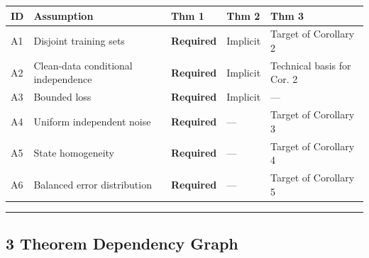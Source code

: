 \documentclass[
  12pt,
]{ctexart}
\begin{document}
\begin{longtable}[]{@{}
  >{\raggedright\arraybackslash}p{}
  >{\raggedright\arraybackslash}p{}
  >{\raggedright\arraybackslash}p{}
  >{\raggedright\arraybackslash}p{}
  >{\raggedright\arraybackslash}p{}@{}}
\toprule\noalign{}
\begin{minipage}[b]{\linewidth}\raggedright
ID
\end{minipage} & \begin{minipage}[b]{\linewidth}\raggedright
Assumption
\end{minipage} & \begin{minipage}[b]{\linewidth}\raggedright
Thm 1
\end{minipage} & \begin{minipage}[b]{\linewidth}\raggedright
Thm 2
\end{minipage} & \begin{minipage}[b]{\linewidth}\raggedright
Thm 3
\end{minipage} \\
\midrule\noalign{}
\endhead
\bottomrule\noalign{}
\endlastfoot
A1 & Disjoint training sets & \textbf{Required} & Implicit & Target of
Corollary 2 \\
A2 & Clean-data conditional independence & \textbf{Required} & Implicit
& Technical basis for Cor. 2 \\
A3 & Bounded loss & \textbf{Required} & Implicit & --- \\
A4 & Uniform independent noise & \textbf{Required} & --- & Target of
Corollary 3 \\
A5 & State homogeneity & \textbf{Required} & --- & Target of Corollary
4 \\
A6 & Balanced error distribution & \textbf{Required} & --- & Target of
Corollary 5 \\
\end{longtable}

\begin{center}\rule{0.5\linewidth}{0.5pt}\end{center}

\subsection{3 Theorem Dependency Graph}\label{theorem-dependency-graph}
\end{document}
